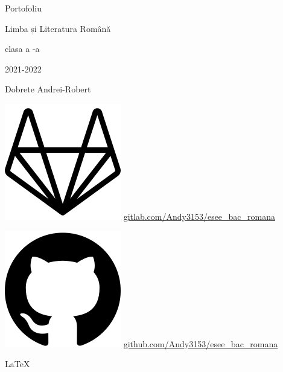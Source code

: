 \documentclass[
12pt,
a4paper
]{article}
\author{} %
\newcommand{\rom}[1]{\uppercase\expandafter{\romannumeral #1\relax}} %
\begin{document}
\begin{center}
 \vspace{9cm}
 {\LARGE Portofoliu}

 \vspace{0.5cm}
 {\Huge Limba și Literatura Română}

 \vspace{0.5cm}
 {\Large clasa a \rom{12}-a}

 \vspace{0.5cm}
 {2021-2022}

 \vspace{0.5cm}
 {\LARGE Dobrete Andrei-Robert}

 \vspace{10.26cm}
 \includegraphics[height=\fontcharht\font`\B]{gitlab}
 \url{gitlab.com/Andy3153/esee_bac_romana}

 \includegraphics[height=\fontcharht\font`\B]{github}
 \url{github.com/Andy3153/esee_bac_romana}

 \vspace{0.5cm}
 {\large\LaTeX}
\end{center}
\end{document}
